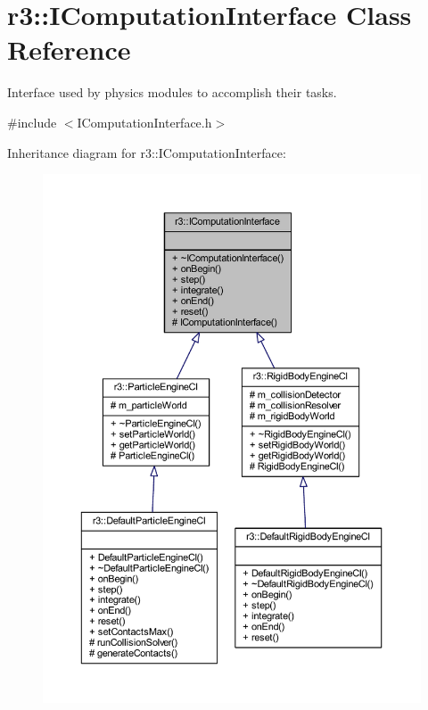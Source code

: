 \hypertarget{classr3_1_1_i_computation_interface}{}\section{r3\+:\+:I\+Computation\+Interface Class Reference}
\label{classr3_1_1_i_computation_interface}


Interface used by physics modules to accomplish their tasks.  




{\ttfamily \#include $<$I\+Computation\+Interface.\+h$>$}



Inheritance diagram for r3\+:\+:I\+Computation\+Interface\+:\nopagebreak
\begin{figure}[H]
\begin{center}
\leavevmode
\includegraphics[width=350pt]{classr3_1_1_i_computation_interface__inherit__graph}
\end{center}
\end{figure}


